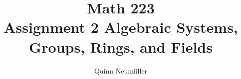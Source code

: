 


% 
% 

 
\title{Math 223 \\
Assignment 2 Algebraic Systems, Groups, Rings, and Fields
}
\author{Quinn Neumiiller} %
 
\maketitle


